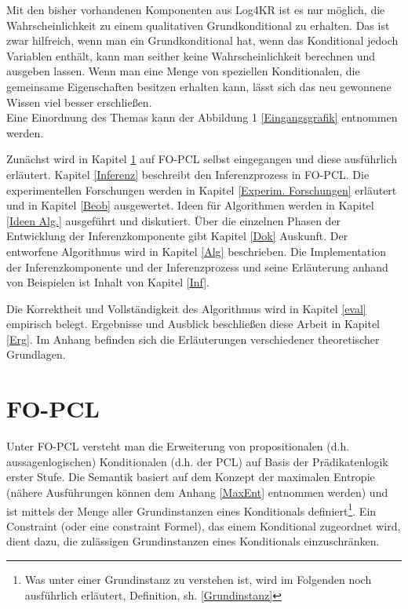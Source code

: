 \documentclass[a4paper, 11pt]{book}
\begin{document}
Mit den bisher vorhandenen Komponenten aus Log4KR ist es nur möglich, die Wahrscheinlichkeit zu einem qualitativen Grundkonditional zu erhalten. Das ist zwar hilfreich, wenn man ein Grundkonditional hat, wenn das Konditional jedoch Variablen enthält, kann man seither keine Wahrscheinlichkeit berechnen und ausgeben lassen.
Wenn man eine Menge von speziellen Konditionalen, die gemeinsame Eigenschaften besitzen erhalten kann, lässt sich das neu gewonnene Wissen viel besser erschließen. \\
Eine Einordnung des Themas kann der Abbildung 1 \ref{Eingangsgrafik} entnommen werden.


Zunächst wird in Kapitel \ref{FO-PCL} auf FO-PCL selbst eingegangen und diese ausführlich erläutert. Kapitel \ref{Inferenz} beschreibt den Inferenzprozess in FO-PCL. Die experimentellen Forschungen werden in Kapitel \ref{Experim. Forschungen} erläutert und in Kapitel \ref{Beob} ausgewertet. Ideen für Algorithmen werden in Kapitel \ref{Ideen Alg.} ausgeführt und diskutiert. Über die einzelnen Phasen der Entwicklung der Inferenzkomponente gibt Kapitel  \ref{Dok} Auskunft. Der entworfene Algorithmus wird in Kapitel \ref{Alg}  beschrieben. Die Implementation der Inferenzkomponente und der Inferenzprozess  und seine Erläuterung anhand von Beispielen ist Inhalt von Kapitel \ref{Inf}. 

 Die Korrektheit und Vollständigkeit des Algorithmus wird in Kapitel \ref{eval} empirisch belegt. Ergebnisse und Ausblick beschließen diese Arbeit in Kapitel \ref{Erg}. Im Anhang befinden sich die Erläuterungen verschiedener theoretischer Grundlagen.



\newpage

\chapter{FO-PCL}\label{FO-PCL} 
Unter FO-PCL versteht man die Erweiterung von propositionalen (d.h. aussagenlogischen) Konditionalen (d.h. der PCL) auf Basis der Prädikatenlogik erster Stufe. Die Semantik basiert auf dem Konzept der maximalen Entropie (nähere Ausführungen können dem Anhang \ref{MaxEnt} entnommen werden) und ist mittels der Menge aller Grundinstanzen  eines Konditionals definiert\footnote{Was unter einer Grundinstanz zu verstehen ist, wird im Folgenden noch ausführlich erläutert, Definition, sh. \ref{Grundinstanz} }. Ein Constraint  (oder eine constraint Formel), das einem Konditional  zugeordnet wird, dient dazu,  die zulässigen Grundinstanzen eines Konditionals einzuschränken.
\end{document}
